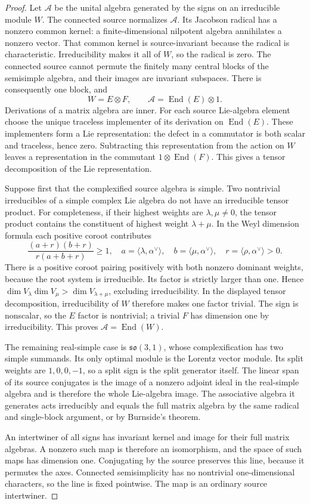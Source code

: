 \begin{proof}
Let $\mathscr A$ be the unital algebra generated by the signs on an
irreducible module $W$.  The connected source normalizes $\mathscr A$.
Its Jacobson radical has a nonzero common kernel: a finite-dimensional
nilpotent algebra annihilates a nonzero vector.  That common kernel is
source-invariant because the radical is characteristic.  Irreducibility
makes it all of $W$, so the radical is zero.  The connected source cannot
permute the finitely many central blocks of the semisimple algebra, and
their images are invariant subspaces.  There is consequently one block,
and
\[
 W=E\otimes F,\qquad
 \mathscr A=\operatorname{End}(E)\otimes1.
\]
Derivations of a matrix algebra are inner.  For each source Lie-algebra
element choose the unique traceless implementer of its derivation on
$\operatorname{End}(E)$.  These implementers form a Lie representation:
the defect in a commutator is both scalar and traceless, hence zero.
Subtracting this representation from the action on $W$ leaves a
representation in the commutant $1\otimes\operatorname{End}(F)$.
This gives a tensor decomposition of the Lie representation.

Suppose first that the complexified source algebra is simple.  Two
nontrivial irreducibles of a simple complex Lie algebra do not have an
irreducible tensor product.  For completeness, if their highest weights
are $\lambda,\mu\ne0$, the tensor product contains the constituent of
highest weight $\lambda+\mu$.  In the Weyl dimension formula each
positive coroot contributes
\[
 \frac{(a+r)(b+r)}{r(a+b+r)}\geq1,
 \quad
 a=\langle\lambda,\alpha^\vee\rangle,\quad
 b=\langle\mu,\alpha^\vee\rangle,\quad
 r=\langle\rho,\alpha^\vee\rangle>0.
\]
There is a positive coroot pairing positively with both nonzero dominant
weights, because the root system is irreducible.  Its factor is strictly
larger than one.  Hence
$\dim V_\lambda\dim V_\mu>\dim V_{\lambda+\mu}$, excluding
irreducibility.  In the displayed tensor decomposition, irreducibility
of $W$ therefore makes one factor trivial.  The sign is nonscalar, so
the $E$ factor is nontrivial; a trivial $F$ has dimension one by
irreducibility.  This proves $\mathscr A=\operatorname{End}(W)$.

The remaining real-simple case is $\mathfrak{so}(3,1)$, whose
complexification has two simple summands.  Its only optimal module is
the Lorentz vector module.  Its split weights are $1,0,0,-1$, so a split
sign is the split generator itself.  The linear span of its source
conjugates is the image of a nonzero adjoint ideal in the real-simple
algebra and is therefore the whole Lie-algebra image.  The associative
algebra it generates acts irreducibly and equals the full matrix algebra
by the same radical and single-block argument, or by Burnside's theorem.

An intertwiner of all signs has invariant kernel and image for their
full matrix algebras.  A nonzero such map is therefore an isomorphism,
and the space of such maps has dimension one.  Conjugating by the source
preserves this line, because it permutes the axes.  Connected
semisimplicity has no nontrivial one-dimensional characters, so the line
is fixed pointwise.  The map is an ordinary source intertwiner.
\end{proof}

